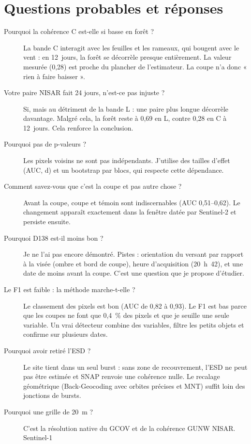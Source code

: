 \documentclass[11pt,a4paper]{article}
\begin{document}
\section{Questions probables et réponses}

\begin{description}
\item[Pourquoi la cohérence C est-elle si basse en forêt ?] La bande C interagit avec les feuilles et les rameaux,
  qui bougent avec le vent : en 12~jours, la forêt se décorrèle presque entièrement. La valeur mesurée (0,28) est
  proche du plancher de l'estimateur. La coupe n'a donc « rien à faire baisser ».
\item[Votre paire NISAR fait 24 jours, n'est-ce pas injuste ?] Si, mais au détriment de la bande L : une paire plus
  longue décorrèle davantage. Malgré cela, la forêt reste à 0,69 en L, contre 0,28 en C à 12~jours. Cela renforce la
  conclusion.
\item[Pourquoi pas de p-valeurs ?] Les pixels voisins ne sont pas indépendants. J'utilise des tailles d'effet (AUC,
  d) et un bootstrap par blocs, qui respecte cette dépendance.
\item[Comment savez-vous que c'est la coupe et pas autre chose ?] Avant la coupe, coupe et témoin sont
  indiscernables (AUC 0,51--0,62). Le changement apparaît exactement dans la fenêtre datée par Sentinel-2 et
  persiste ensuite.
\item[Pourquoi D138 est-il moins bon ?] Je ne l'ai pas encore démontré. Pistes : orientation du versant par rapport
  à la visée (ombre et bord de coupe), heure d'acquisition (20~h~42), et une date de moins avant la coupe. C'est
  une question que je propose d'étudier.
\item[Le F1 est faible : la méthode marche-t-elle ?] Le classement des pixels est bon (AUC de 0,82 à 0,93). Le F1
  est bas parce que les coupes ne font que 0,4~\% des pixels et que je seuille une seule variable. Un vrai
  détecteur combine des variables, filtre les petits objets et confirme sur plusieurs dates.
\item[Pourquoi avoir retiré l'ESD ?] Le site tient dans un seul burst : sans zone de recouvrement, l'ESD ne peut pas
  être estimée et SNAP renvoie une cohérence nulle. Le recalage géométrique (Back-Geocoding avec orbites précises et
  MNT) suffit loin des jonctions de bursts.
\item[Pourquoi une grille de 20~m ?] C'est la résolution native du GCOV et de la cohérence GUNW NISAR. Sentinel-1

\end{description}
\end{document}
